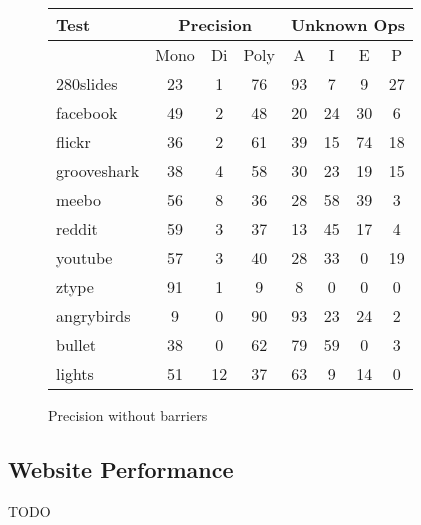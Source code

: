 \begin{figure}
\begin{center}
\begin{tabular}{|l|ccc|cccc|}
\hline
Test & \multicolumn{3}{|c|}{Precision}
     & \multicolumn{4}{|c|}{Unknown Ops} \\
\hline
     & Mono & Di & Poly & A & I & E & P \\
\hline
280slides      & 23 & 1 & 76 & 93 & 7 & 9 & 27 \\
facebook       & 49 & 2 & 48 & 20 & 24 & 30 & 6 \\
flickr         & 36 & 2 & 61 & 39 & 15 & 74 & 18 \\
grooveshark    & 38 & 4 & 58 & 30 & 23 & 19 & 15 \\
meebo          & 56 & 8 & 36 & 28 & 58 & 39 & 3 \\
reddit         & 59 & 3 & 37 & 13 & 45 & 17 & 4 \\
youtube        & 57 & 3 & 40 & 28 & 33 & 0 & 19 \\
ztype          & 91 & 1 & 9 & 8 & 0 & 0 & 0 \\
angrybirds     & 9 & 0 & 90 & 93 & 23 & 24 & 2 \\
bullet         & 38 & 0 & 62 & 79 & 59 & 0 & 3 \\
lights         & 51 & 12 & 37 & 63 & 9 & 14 & 0 \\
\hline
\end{tabular}
\end{center}
\caption{Precision without barriers}
\end{figure}

\subsection{Website Performance}

TODO
